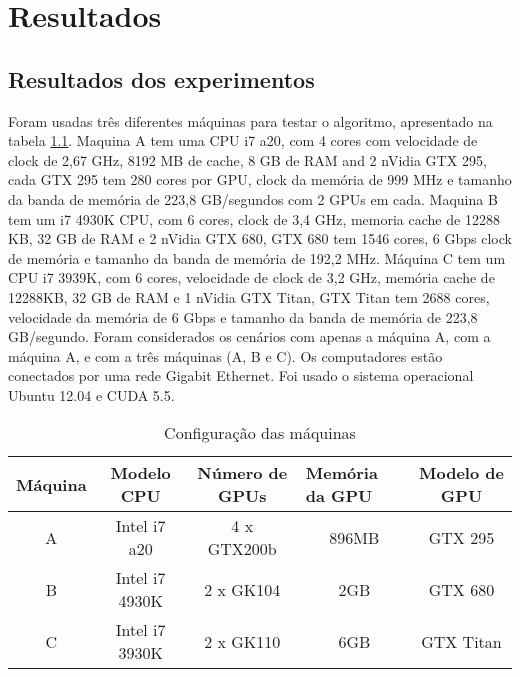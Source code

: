 \pagestyle{empty}
\cleardoublepage
\pagestyle{fancy}

\chapter{Resultados}\label{cap6}

\section{Resultados dos experimentos}\label{cap6:intro}

Foram usadas três diferentes máquinas para testar o algoritmo, apresentado na tabela \ref{table: machines}. Maquina A tem uma CPU i7 a20, com 4 cores com velocidade de clock de 2,67 GHz, 8192 MB de cache, 8 GB de RAM and 2 nVidia GTX 295, cada GTX 295 tem 280 cores por GPU, clock da memória de 999 MHz e tamanho da banda de memória de 223,8 GB/segundos com 2 GPUs em cada. Maquina B  tem um i7 4930K CPU, com 6 cores, clock de 3,4 GHz, memoria cache de 12288 KB, 32 GB de RAM e 2 nVidia GTX 680, GTX 680 tem 1546 cores, 6 Gbps clock de memória e tamanho da banda de memória de 192,2 MHz. Máquina C tem um CPU i7 3939K, com 6 cores, velocidade de clock de 3,2 GHz, memória cache de 12288KB, 32 GB de RAM e 1 nVidia GTX Titan, GTX Titan tem 2688 cores, velocidade da memória de 6 Gbps e tamanho da banda de memória de 223,8 GB/segundo. Foram considerados os cenários com apenas a máquina A, com a máquina A, e com a três máquinas (A, B e C). Os computadores estão conectados por uma rede Gigabit Ethernet. Foi usado o sistema operacional Ubuntu 12.04 e CUDA 5.5.


\begin{table}[!t]
\centering
\tiny
\caption{Configuração das máquinas}

\begin{tabular}{|c|c|c|c|c|}
\hline
\multicolumn{1}{|l|}{Máquina} & Modelo CPU  & Número de GPUs & \multicolumn{1}{l|}{Memória da GPU } & Modelo de GPU \\ \hline
A                             & Intel i7 a20   & 4 x GTX200b         & 896MB                          & GTX 295   \\ \hline
B                             & Intel i7 4930K  & 2 x GK104           & 2GB                            & GTX 680   \\ \hline
C                             & Intel i7 3930K & 2 x GK110     & 6GB                            & GTX Titan \\ \hline
\end{tabular}
\label{table: machines}
\end{table}


